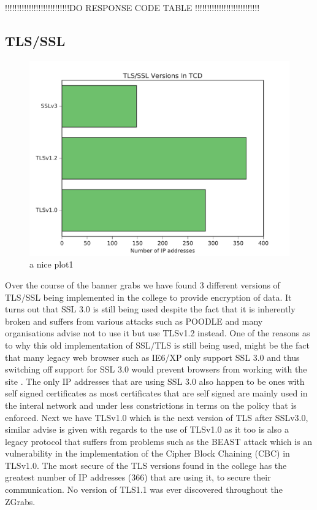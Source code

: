 \documentclass[a4wide,leqno,12pt]{report}
\begin{document}
!!!!!!!!!!!!!!!!!!!!!!!!!!!DO RESPONSE CODE TABLE !!!!!!!!!!!!!!!!!!!!!!!!!!!



\subsection{TLS/SSL}
\begin{figure}[H]
\centering
\includegraphics[scale=.5]{pdf_images/TLSVersionsInTCD}
\caption{a nice plot1}
\label{fig:TLS_SSL}
\end{figure}

Over the course of the banner grabs we have found 3 different versions of TLS/SSL being implemented in the college to provide encryption of data. It turns out that SSL 3.0 is still being used despite the fact that it is inherently broken and suffers from various attacks such as POODLE\cite{holz2015summarizing} \cite{moller2014poodle} and many organisations \cite{ssllabs} advise not to use it  but use TLSv1.2 instead. One of the reasons as to why this old implementation of SSL/TLS is still being used, might be the fact that many legacy web browser such as IE6/XP only support SSL 3.0 and thus switching off support for SSL 3.0 would prevent browsers from working with the site \cite{owaspTLS_SSL}. The only IP addresses that are using SSL 3.0 also happen to be ones with self signed certificates as most certificates that are self signed are mainly used in the interal network and under less constrictions in terms on the policy that is enforced. Next we have TLSv1.0 which is the next version of TLS after SSLv3.0, similar advise is given with regards to the use of TLSv1.0 as it too is also a legacy protocol that suffers from problems such as the BEAST attack\cite{holz2015summarizing} which is an vulnerability in the implementation of the Cipher Block Chaining (CBC) in TLSv1.0. The most secure of the TLS versions found in the college has the greatest number of IP addresses (366) that are using it, to secure their communication. No version of TLS1.1 was ever discovered throughout the ZGrabs.
\end{document}
